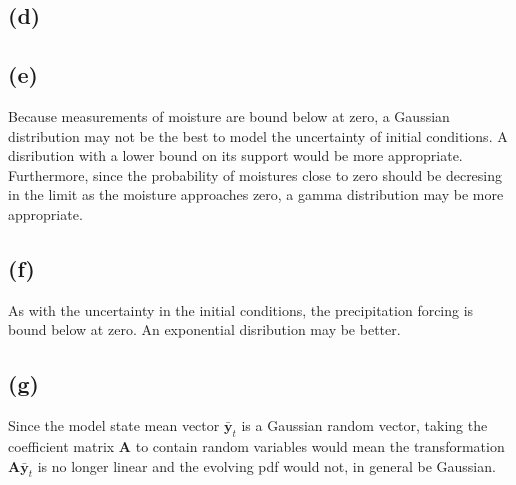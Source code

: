 \documentclass[fleqn, letterpaper]{tufte-handout}
\begin{document}
\subsection{(d)}

\subsection{(e)}

Because measurements of moisture are bound below at zero, a Gaussian distribution may not be the best to model the uncertainty of initial conditions. A disribution with a lower bound on its support would be more appropriate. Furthermore, since the probability of moistures close to zero should be decresing in the limit as the moisture approaches zero, a gamma distribution may be more appropriate.

\subsection{(f)}

As with the uncertainty in the initial conditions, the precipitation forcing is bound below at zero. An exponential disribution may be better. 

\subsection{(g)}

Since the model state mean vector $\bar{\mathbf{y}}_t$ is a Gaussian random vector, taking the coefficient matrix $\mathbf{A}$ to contain random variables would mean the transformation $\mathbf{A}\bar{\mathbf{y}}_t$ is no longer linear and the evolving pdf would not, in general be Gaussian.
\end{document}
